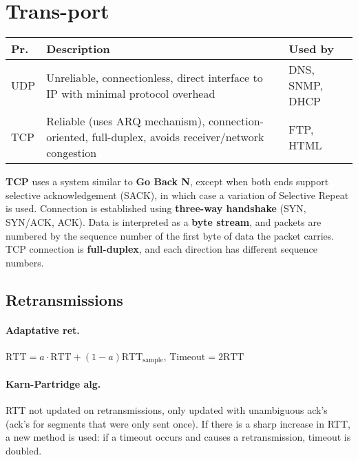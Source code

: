 \documentclass{form}
\begin{document}
\begin{minipage}[c]{0.603\textwidth}

    \begin{minipage}{0.14\linewidth}
        \section*{Trans-port}
    \end{minipage}%
    \begin{minipage}{0.86\linewidth}
        \begin{tabular}{@{}l | p{23.2em} | p{5.7em}@{}}
            \textbf{Pr.} & \textbf{Description} & \textbf{Used by} \\ \hline \hline
            UDP & Unreliable, connectionless, direct interface to IP with minimal protocol overhead & DNS, SNMP, DHCP\\ \hline
            TCP & Reliable (uses ARQ mechanism), connection-oriented, full-duplex, avoids receiver/network congestion & FTP, HTML
        \end{tabular}
    \end{minipage}
    \vspace{-1.5em}
    \begin{multicols}{2}
        \textbf{TCP} uses a system similar to \textbf{Go Back N}, except when both ends support selective acknowledgement (SACK), in which case a variation of Selective Repeat is used. Connection is established using \textbf{three-way handshake} (SYN, SYN/ACK, ACK). Data is interpreted as a \textbf{byte stream}, and packets are numbered by the sequence number of the first byte of data the packet carries. TCP connection is \textbf{full-duplex}, and each direction has different sequence numbers.

        \subsection*{Retransmissions}

        \paragraph{Adaptative ret.}
        $\text{RTT}=a \cdot \text{RTT} + (1-a) \text{RTT}_{\text{sample}}$, $\text{Timeout}=2\text{RTT}$

        \paragraph{Karn-Partridge alg.}
        RTT not updated on retransmissions, only updated with unambiguous ack's (ack's for segments that were only sent once). If there is a sharp increase in RTT, a new method is used: if a timeout occurs and causes a retransmission, timeout is doubled.
    \end{multicols}
\end{minipage}
\end{document}
